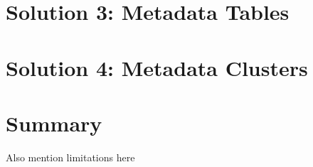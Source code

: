 

 

\section{Solution 3:  Metadata Tables}\label{s:sol3}



\section{Solution 4:  Metadata Clusters}\label{s:sol4}

\section{Summary}\label{s:solutions-summary}
Also mention limitations here





